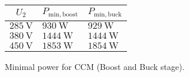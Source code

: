 \begin{solutiontable}[htb]
    \centering  %
    \begin{tabular}{lll}
        \toprule
        \multicolumn{1}{c}{$U_\mathrm{2}$} & \multicolumn{1}{c}{$P_\mathrm{min,boost}$} 
        & \multicolumn{1}{c}{$P_\mathrm{min,buck}$} \\
        \midrule 
        $\SI{285}{\volt}$ & $\SI{930}{\watt}$ & $\SI{929}{\watt}$\\ 
        $\SI{380}{\volt}$ & $\SI{1444}{\watt}$ & $\SI{1444}{\watt}$ \\ 
        $\SI{450}{\volt}$ & $\SI{1853}{\watt}$ & $\SI{1854}{\watt}$\\ 
        \bottomrule
    \end{tabular}
    \caption{Minimal power for CCM (Boost and Buck stage).}
    \label{table:PowerminInputOutputStage}
\end{solutiontable}

